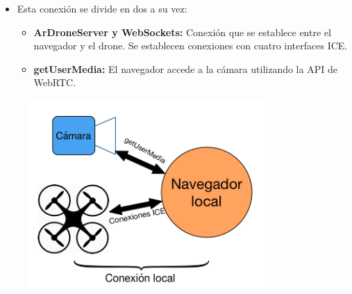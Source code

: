 \documentclass[notes,slidesec,a4]{seminar}
\begin{document}
\begin{hslide}
\begin{minipage}[t]{0.7\textwidth}
\begin{itemize}
\item Esta conexión se divide en dos a su vez:
\begin{itemize}
\item \textbf{ArDroneServer y WebSockets:} Conexión que se establece entre el navegador y el drone. Se establecen conexiones con cuatro interfaces ICE.
\item \textbf{getUserMedia:} El navegador accede a la cámara utilizando la API de WebRTC.
\end{itemize}
\end{itemize}

\end{minipage}
\begin{minipage}[t]{0.5\textwidth}
\begin{center}
\begin{figure}
\includegraphics[width=0.8\textwidth]{img/conexionlocal}
\end{figure}
\end{center}
\end{minipage}
\end{hslide}


\end{document}
